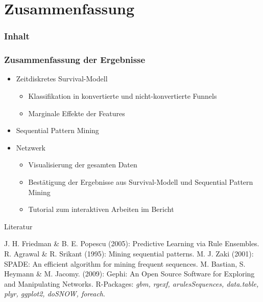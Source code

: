 \section{Zusammenfassung}

\begin{frame}\frametitle{Inhalt}
\end{frame}

\begin{frame}\frametitle{Zusammenfassung der Ergebnisse}
	\begin{itemize}
		\item Zeitdiskretes Survival-Modell
		\begin{itemize}
			\item Klassifikation in konvertierte und nicht-konvertierte Funnels
			\item Marginale Effekte der Features
		\end{itemize}
		\item Sequential Pattern Mining
		\item Netzwerk
		\begin{itemize}
			\item Visualisierung der gesamten Daten
			\item Bestätigung der Ergebnisse aus Survival-Modell und Sequential Pattern Mining
			\item Tutorial zum interaktiven Arbeiten im Bericht
		\end{itemize}
	\end{itemize}
\end{frame}

\begin{frame}{Literatur}
	\begin{thebibliography}{1}
		\bibitem{} J. H. Friedman \& B. E. Popescu (2005): {\glqq Predictive Learning via Rule Ensembles\grqq}.
		\bibitem{} R. Agrawal \& R. Srikant (1995): {\glqq Mining sequential patterns\grqq}.
		\bibitem{} M. J. Zaki (2001): {\glqq SPADE: An efficient algorithm for mining frequent sequences\grqq}.
		\bibitem{} M. Bastian, S. Heymann \& M. Jacomy. (2009): {\glqq Gephi: An Open Source Software for Exploring and Manipulating Networks\grqq}.
		\bibitem{} R-Packages: \textit{gbm, rgexf, arulesSequences, data.table, plyr, ggplot2, doSNOW, foreach}.
	\end{thebibliography}
\end{frame} 